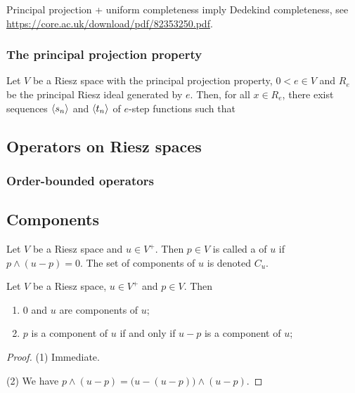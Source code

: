 Principal projection + uniform completeness imply Dedekind completeness, see \url{https://core.ac.uk/download/pdf/82353250.pdf}.

\subsubsection{The principal projection property}

\begin{theorem}
Let $V$ be a Riesz space with the principal projection property, $0 < e \in V$ and $R_e$ be the principal Riesz ideal generated by $e$. Then, for all $x\in R_e$, there exist sequences $\left\langle s_n \right\rangle$ and $\left\langle t_n \right\rangle$ of $e$-step functions such that
\end{theorem}

\subsection{Operators on Riesz spaces}
\subsubsection{Order-bounded operators}

\subsection{Components}
\begin{definition}
Let $V$ be a Riesz space and $u\in V^+$. Then $p\in V$ is called a  of $u$ if $p\wedge (u-p) = 0$. The set of components of $u$ is denoted $C_u$.
\end{definition}

\begin{lemma} \label{RieszComponentsLemma}
Let $V$ be a Riesz space, $u\in V^+$ and $p\in V$. Then
\begin{enumerate}
\item $0$ and $u$ are components of $u$;
\item $p$ is a component of $u$ \textup{if and only if} $u-p$ is a component of $u$;
\end{enumerate}
\end{lemma}
\begin{proof}
(1) Immediate.

(2) We have $p\wedge (u-p) = \big(u - (u-p)\big)\wedge (u-p)$.
\end{proof}

